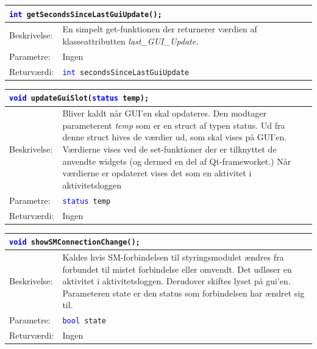 \begin{table}[H]
\begin{tabular}{l p{12.5cm}}
\multicolumn{2}{l}{\texttt{\textcolor{blue}{int} getSecondsSinceLastGuiUpdate();}} \\
\hline
Beskrivelse:& En simpelt get-funktionen der returnerer værdien af klasseattributten \textit{last\_GUI\_Update.} \\
Parametre:&Ingen\\
Returværdi:&\texttt{\textcolor{blue}{int} secondsSinceLastGuiUpdate}\\
\end{tabular}
\end{table}

\begin{table}[H]
\begin{tabular}{l p{12.5cm}}
\multicolumn{2}{l}{\texttt{\textcolor{blue}{void} updateGuiSlot(\textcolor{blue}{status} temp);}} \\
\hline
Beskrivelse:& Bliver kaldt når GUI'en skal opdateres. 
Den modtager parameterent \textit{temp} som er en struct af typen status. 
Ud fra denne struct hives de værdier ud, som skal vises på GUI'en. Værdierne vises ved de set-funktioner der er tilknyttet de anvendte widgets (og dermed en del af Qt-frameworket.) 
Når værdierne er opdateret vises det som en aktivitet i aktivitetsloggen \\   
Parametre:&\texttt{\textcolor{blue}{status} temp}\\
Returværdi:&Ingen\\
\end{tabular}
\end{table}

\begin{table}[H]
\begin{tabular}{l p{12.5cm}}
\multicolumn{2}{l}{\texttt{\textcolor{blue}{void} showSMConnectionChange();}} \\
\hline
Beskrivelse:& Kaldes hvis SM-forbindelsen til styringsmodulet ændres fra forbundet til mistet forbindelse eller omvendt. Det udløser en aktivitet i aktivitetsloggen. Derudover skiftes lyset på gui'en. Parameteren state er den status som forbindelsen har ændret sig til.\\   
Parametre:&\texttt{\textcolor{blue}{bool} state}\\
Returværdi:&Ingen\\
\end{tabular}
\end{table}


